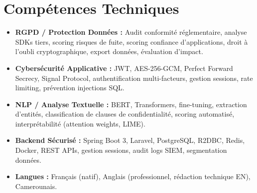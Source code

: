 \documentclass[a4paper,11pt]{article}
\begin{document}
\section{Comp\'etences Techniques}
\begin{itemize}[leftmargin=*, nosep]
    \item \small{\textbf{RGPD / Protection Donn\'ees :} Audit conformité réglementaire, analyse SDKs tiers, scoring risques de fuite, scoring confiance d'applications, droit à l'oubli cryptographique, export données, évaluation d'impact.}
    \item \small{\textbf{Cybersécurité Applicative :} JWT, AES-256-GCM, Perfect Forward Secrecy, Signal Protocol, authentification multi-facteurs, gestion sessions, rate limiting, prévention injections SQL.}
    \item \small{\textbf{NLP / Analyse Textuelle :} BERT, Transformers, fine-tuning, extraction d'entités, classification de clauses de confidentialité, scoring automatisé, interprétabilité (attention weights, LIME).}
    \item \small{\textbf{Backend S\'ecuris\'e :} Spring Boot 3, Laravel, PostgreSQL, R2DBC, Redis, Docker, REST APIs, gestion sessions, audit logs SIEM, segmentation données.}
    \item \small{\textbf{Langues :} Français (natif), Anglais (professionnel, rédaction technique EN), Camerounais.}
\end{itemize}
\end{document}
